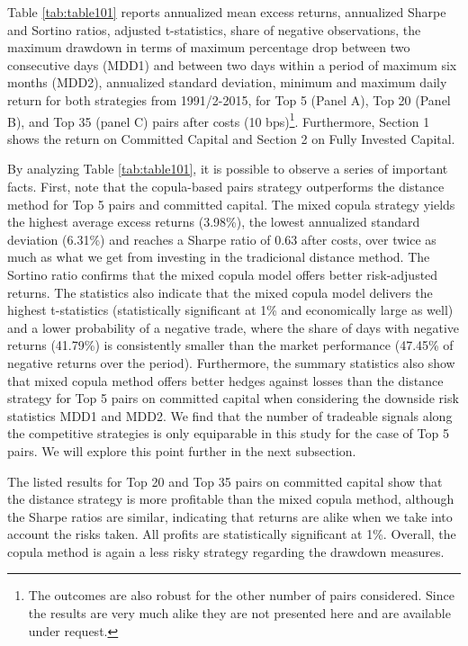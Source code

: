 \documentclass[a4paper]{article}
\begin{document}
Table \ref{tab:table101} reports annualized mean excess returns, annualized Sharpe and Sortino ratios, \citet*{nw87} adjusted t-statistics, share of negative observations, the maximum drawdown in terms of maximum percentage drop between two consecutive days (MDD1) and between two days within a period of maximum six months (MDD2), annualized standard deviation, minimum and maximum daily return for both strategies from 1991/2-2015, for Top 5 (Panel A), Top 20 (Panel B), and Top 35 (panel C) pairs after costs (10 bps)\footnote{The outcomes are also robust for the other number of pairs considered. Since the results are very much alike they are not presented here and are available under request.}. Furthermore, Section 1 shows the return on Committed Capital and Section 2 on Fully Invested Capital. %
	
By analyzing Table \ref{tab:table101}, it is possible to observe a series of important facts. First, note that the copula-based pairs strategy outperforms the distance method for Top 5 pairs and committed capital. The mixed copula strategy yields the highest average excess returns (3.98\%), the lowest annualized standard deviation (6.31\%) and reaches a Sharpe ratio of 0.63 after costs, over twice as much as what we get from investing in the tradicional distance method. The Sortino ratio confirms that the mixed copula model offers better risk-adjusted returns. The statistics also indicate that the mixed copula model delivers the highest t-statistics (statistically significant at 1\% and economically large as well) and a lower probability of a negative trade, where the share of days with negative returns (41.79\%) is consistently smaller than the market performance (47.45\% of negative returns over the period). Furthermore, the summary statistics also show that mixed copula method offers better hedges against losses than the distance strategy for Top 5 pairs on committed capital when considering the downside risk statistics MDD1 and MDD2. We find that the number of tradeable signals along the competitive strategies is only equiparable in this study for the case of Top 5 pairs. We will explore this point further in the next subsection.

 The listed results for Top 20 and Top 35 pairs on committed capital show that the distance strategy is more profitable than the mixed copula method, although the Sharpe ratios are similar, indicating that returns are alike when we take into account the risks taken. All profits are statistically significant at 1\%. Overall, the copula method is again a less risky strategy regarding the drawdown measures.
\end{document}
